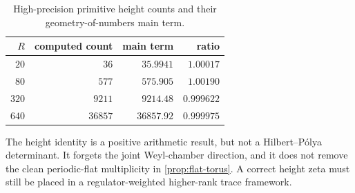 \begin{table}[ht]
\centering
\caption{High-precision primitive height counts and their geometry-of-numbers main term.}
\label{tab:height-count}
\begin{tabular}{rrrr}
\toprule
$R$ & computed count & main term & ratio\\
\midrule
$20$ & $36$ & $35.9941$ & $1.00017$\\
$80$ & $577$ & $575.905$ & $1.00190$\\
$320$ & $9211$ & $9214.48$ & $0.999622$\\
$640$ & $36857$ & $36857.92$ & $0.999975$\\
\bottomrule
\end{tabular}
\end{table}

The height identity is a positive arithmetic result, but not a
Hilbert--P\'olya determinant.  It forgets the joint Weyl-chamber direction,
and it does not remove the clean periodic-flat multiplicity in
\cref{prop:flat-torus}.  A correct height zeta must still be placed in a
regulator-weighted higher-rank trace framework.
